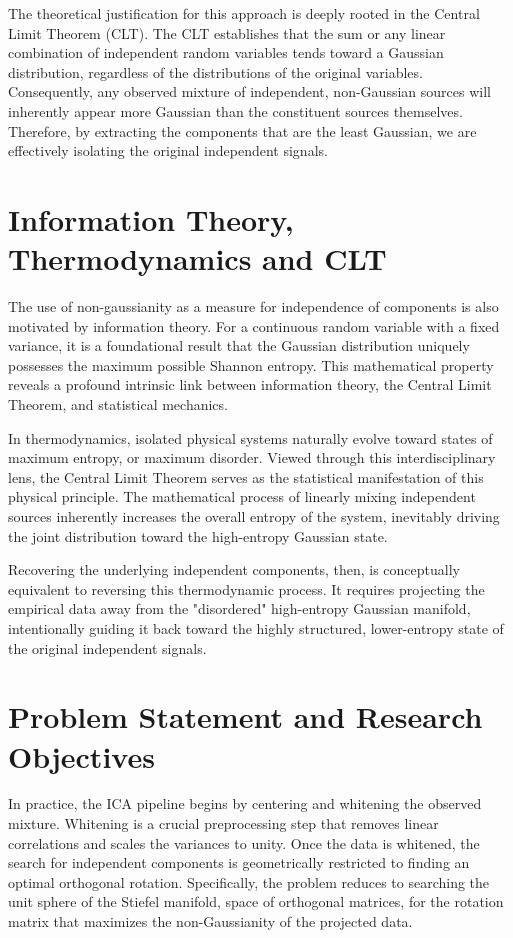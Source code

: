 \documentclass[12pt,a4paper,twoside,openany]{book}
\begin{document}
The theoretical justification for this approach is deeply rooted in the Central Limit Theorem (CLT). 
The CLT establishes that the sum or any linear combination of independent random variables tends toward a Gaussian distribution, 
regardless of the distributions of the original variables. Consequently, any observed mixture of independent, 
non-Gaussian sources will inherently appear more Gaussian than the constituent sources themselves. 
Therefore, by extracting the components that are the least Gaussian, we are effectively isolating the original independent signals.

\section{Information Theory, Thermodynamics and CLT}
The use of non-gaussianity as a measure for independence of components is also motivated by information 
theory. For a continuous random variable with a fixed variance, it is a foundational result that the Gaussian 
distribution uniquely possesses the maximum possible Shannon entropy. This mathematical property reveals a 
profound intrinsic link between information theory, the Central Limit Theorem, and statistical mechanics. 

In thermodynamics, isolated physical systems naturally evolve toward states of maximum entropy, or maximum 
disorder. Viewed through this interdisciplinary lens, the Central Limit Theorem serves as the statistical 
manifestation of this physical principle. The mathematical process of linearly mixing independent sources 
inherently increases the overall entropy of the system, inevitably driving the joint distribution toward 
the high-entropy Gaussian state. 

Recovering the underlying independent components, then, is conceptually equivalent to reversing this 
thermodynamic process. It requires projecting the empirical data away from the "disordered" high-entropy 
Gaussian manifold, intentionally guiding it back toward the highly structured, lower-entropy state of the 
original independent signals.

\section{Problem Statement and Research Objectives}
In practice, the ICA pipeline begins by centering and whitening the observed mixture. 
Whitening is a crucial preprocessing step that removes linear correlations and scales the variances to unity. Once the data is whitened, 
the search for independent components is geometrically restricted to finding an optimal orthogonal rotation. 
Specifically, the problem reduces to searching the unit sphere of the Stiefel manifold, space of orthogonal matrices, 
for the rotation matrix that maximizes the non-Gaussianity of the projected data.
\end{document}
